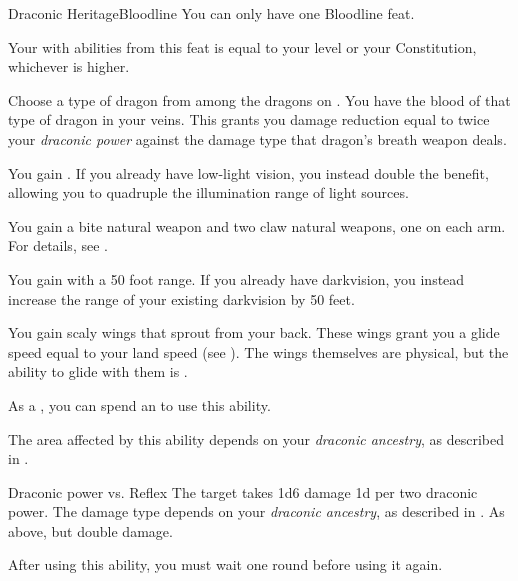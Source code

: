     \begin{feat}{Draconic Heritage}{Bloodline}
         You can only have one Bloodline feat.
        \featben

         Your  with abilities from this feat is equal to your level or your Constitution, whichever is higher.

         Choose a type of dragon from among the dragons on .
        You have the blood of that type of dragon in your veins.
        This grants you damage reduction equal to twice your \textit{draconic power} against the damage type that dragon's breath weapon deals.

         You gain .
        If you already have low-light vision, you instead double the benefit, allowing you to quadruple the illumination range of light sources.

         You gain a bite natural weapon and two claw natural weapons, one on each arm.
        For details, see .

         You gain  with a 50 foot range.
        If you already have darkvision, you instead increase the range of your existing darkvision by 50 feet.

         You gain scaly wings that sprout from your back.
        These wings grant you a glide speed equal to your land speed (see ).
        The wings themselves are physical, but the ability to glide with them is .

         As a , you can spend an  to use this ability.
        \begin{ability}
            \begin{spelltargetinginfo}
                \spellspecial The area affected by this ability depends on your \textit{draconic ancestry}, as described in .
            \end{spelltargetinginfo}
            \begin{spelleffects}
                \begin{spellattack}{Draconic power vs. Reflex}
                    \spellsuccess The target takes 1d6 damage \plus1d per two draconic power.
                    The damage type depends on your \textit{draconic ancestry}, as described in .
                    \spellcritical As above, but double damage.
                \end{spellattack}
                \spellspecial After using this ability, you must wait one round before using it again.
            \end{spelleffects}
        \end{ability}


\end{feat}
